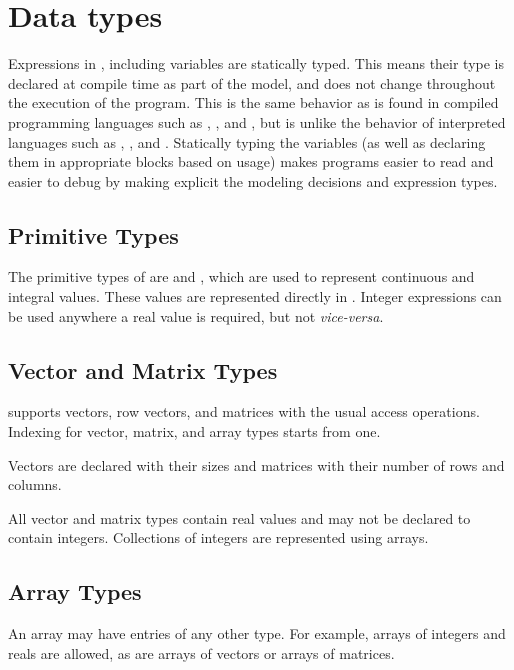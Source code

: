 \documentclass[article]{jss}
\begin{document}
\section{Data types}

Expressions in , including variables are statically
typed.  This means their type is declared at compile time as part of
the model, and does not change throughout the execution of the
program.  This is the same behavior as is found in compiled
programming languages such as , ,
and , but is unlike the behavior of interpreted
languages such as , , and
.  Statically typing the variables (as well as
declaring them in appropriate blocks based on usage) makes
 programs easier to read and easier to debug by making
explicit the modeling decisions and expression types.

\subsection{Primitive Types}

The primitive types of  are  and ,
which are used to represent continuous and integral values.  These
values are represented directly in .  Integer
expressions can be used anywhere a real value is required, but not
{\it vice-versa}.

\subsection{Vector and Matrix Types}

 supports vectors, row vectors, and matrices with the
usual access operations.  Indexing for vector, matrix, and array types
starts from one.  

Vectors are declared with their sizes and matrices with their number
of rows and columns.

All vector and matrix types contain real values and may not be
declared to contain integers.  Collections of integers are represented
using arrays.

\subsection{Array Types}

An array may have entries of any other type.  For example, arrays of
integers and reals are allowed, as are arrays of vectors or arrays of
matrices.  
\end{document}

